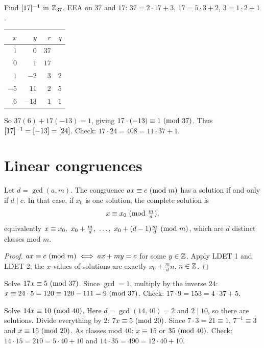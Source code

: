 \begin{example}
Find $[17]^{-1}$ in $\mathbb{Z}_{37}$. EEA on $37$ and $17$: $37 = 2\cdot 17 + 3$, $17 = 5\cdot 3 + 2$,
$3 = 1\cdot 2 + 1$.
\begin{center}
\begin{tabular}{rrrr}
\toprule
$x$ & $y$ & $r$ & $q$\\
\midrule
$1$ & $0$ & $37$ & \\
$0$ & $1$ & $17$ & \\
$1$ & $-2$ & $3$ & $2$\\
$-5$ & $11$ & $2$ & $5$\\
$6$ & $-13$ & $1$ & $1$\\
\bottomrule
\end{tabular}
\end{center}
So $37(6) + 17(-13) = 1$, giving $17 \cdot (-13) \equiv 1 \ (\mathrm{mod}\ 37)$. Thus
$[17]^{-1} = [-13] = [24]$. Check: $17\cdot 24 = 408 = 11\cdot 37 + 1$.
\end{example}

\section{Linear congruences}

\begin{theorem}
Let $d = \gcd(a,m)$. The congruence $ax \equiv c \ (\mathrm{mod}\ m)$ has a solution if and only if
$d \mid c$. In that case, if $x_0$ is one solution, the complete solution is
\[ x \equiv x_0 \ (\mathrm{mod}\ \tfrac md), \]
equivalently $x \equiv x_0,\ x_0 + \tfrac md,\ \dots,\ x_0 + (d-1)\tfrac md \ (\mathrm{mod}\ m)$, which are
$d$ distinct classes mod $m$.
\end{theorem}
\begin{proof}
$ax \equiv c \ (\mathrm{mod}\ m) \iff ax + my = c$ for some $y \in \mathbb{Z}$. Apply LDET 1 and LDET 2: the $x$-values of
solutions are exactly $x_0 + \frac md n$, $n \in \mathbb{Z}$.
\end{proof}

\begin{example}
Solve $17x \equiv 5 \ (\mathrm{mod}\ 37)$. Since $\gcd = 1$, multiply by the inverse $24$:
$x \equiv 24\cdot 5 = 120 \equiv 120 - 111 = 9 \ (\mathrm{mod}\ 37)$. Check: $17 \cdot 9 = 153 = 4\cdot 37 + 5$.
\end{example}

\begin{example}
Solve $14x \equiv 10 \ (\mathrm{mod}\ 40)$. Here $d = \gcd(14,40) = 2$ and $2 \mid 10$, so there are
solutions. Divide everything by $2$: $7x \equiv 5 \ (\mathrm{mod}\ 20)$. Since $7\cdot 3 = 21 \equiv 1$,
$7^{-1} \equiv 3$ and $x \equiv 15 \ (\mathrm{mod}\ 20)$. As classes mod $40$: $x \equiv 15$ or
$35 \ (\mathrm{mod}\ 40)$. Check: $14\cdot 15 = 210 = 5\cdot 40 + 10$ and $14 \cdot 35 = 490 = 12\cdot 40 + 10$.
\end{example}

